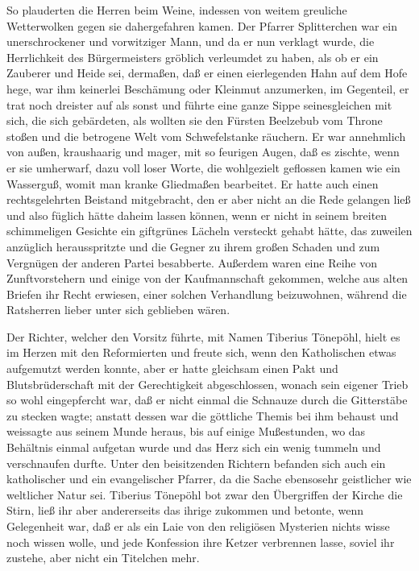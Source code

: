 So plauderten die Herren beim Weine, indessen von weitem greuliche
Wetterwolken gegen sie dahergefahren kamen. Der Pfarrer
Splitterchen war ein unerschrockener und vorwitziger Mann, und da
er nun verklagt wurde, die Herrlichkeit des Bürgermeisters gröblich
verleumdet zu haben, als ob er ein Zauberer und Heide sei,
dermaßen, daß er einen eierlegenden Hahn auf dem Hofe hege, war ihm
keinerlei Beschämung oder Kleinmut anzumerken, im Gegenteil, er
trat noch dreister auf als sonst und führte eine ganze Sippe
seinesgleichen mit sich, die sich gebärdeten, als wollten sie den
Fürsten Beelzebub vom Throne stoßen und die betrogene Welt vom
Schwefelstanke räuchern. Er war annehmlich von außen, kraushaarig
und mager, mit so feurigen Augen, daß es zischte, wenn er sie
umherwarf, dazu voll loser Worte, die wohlgezielt geflossen kamen
wie ein Wasserguß, womit man kranke Gliedmaßen bearbeitet. Er hatte
auch einen rechtsgelehrten Beistand mitgebracht, den er aber nicht
an die Rede gelangen ließ und also füglich hätte daheim lassen
können, wenn er nicht in seinem breiten schimmeligen Gesichte ein
giftgrünes Lächeln versteckt gehabt hätte, das zuweilen anzüglich
herausspritzte und die Gegner zu ihrem großen Schaden und zum
Vergnügen der anderen Partei besabberte. Außerdem waren eine Reihe
von Zunftvorstehern und einige von der Kaufmannschaft gekommen,
welche aus alten Briefen ihr Recht erwiesen, einer solchen
Verhandlung beizuwohnen, während die Ratsherren lieber unter sich
geblieben wären.

\pagenum{[23]}Der Richter, welcher den Vorsitz führte, mit Namen
Tiberius Tönepöhl, hielt es im Herzen mit den Reformierten und
freute sich, wenn den Katholischen etwas aufgemutzt werden konnte,
aber er hatte gleichsam einen Pakt und Blutsbrüderschaft mit der
Gerechtigkeit abgeschlossen, wonach sein eigener Trieb so wohl
eingepfercht war, daß er nicht einmal die Schnauze durch die
Gitterstäbe zu stecken wagte; anstatt dessen war die göttliche
Themis bei ihm behaust und weissagte aus seinem Munde heraus, bis
auf einige Mußestunden, wo das Behältnis einmal aufgetan wurde und
das Herz sich ein wenig tummeln und verschnaufen durfte. Unter den
beisitzenden Richtern befanden sich auch ein katholischer und ein
evangelischer Pfarrer, da die Sache ebensosehr geistlicher wie
weltlicher Natur sei. Tiberius Tönepöhl bot zwar den Übergriffen
der Kirche die Stirn, ließ ihr aber andererseits das ihrige
zukommen und betonte, wenn Gelegenheit war, daß er als ein Laie von
den religiösen Mysterien nichts wisse noch wissen wolle, und jede
Konfession ihre Ketzer verbrennen lasse, soviel ihr zustehe, aber
nicht ein Titelchen mehr.

